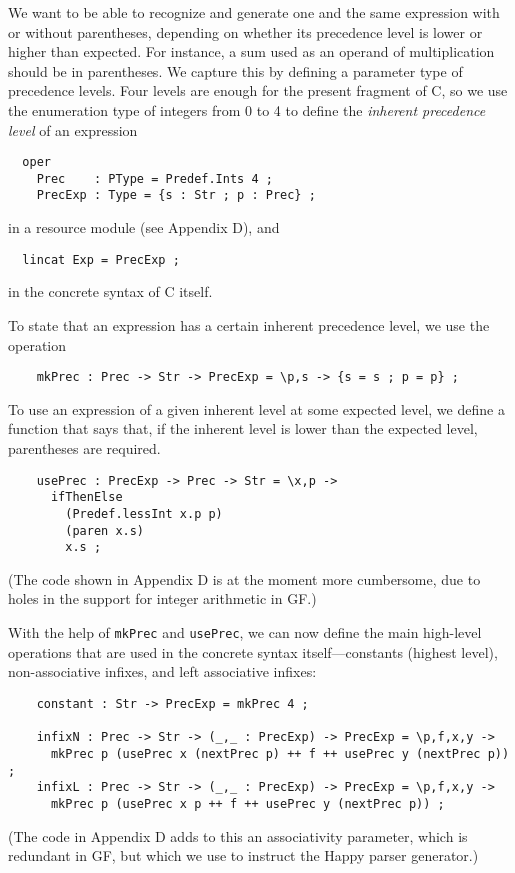 \documentclass[12pt]{article}
\newcommand{\empha}[1]{{\em #1}}
\begin{document}
We want to be able to recognize and generate one and the same expression with
or without parentheses, depending on whether its precedence level
is lower or higher than expected. For instance, a sum used as
an operand of multiplication should be in parentheses. We
capture this by defining a parameter type of
precedence levels. Four levels are enough for the present
fragment of C, so we use the enumeration type of 
integers from 0 to 4 to define the \empha{inherent precedence level}
of an expression
\begin{verbatim} 
  oper 
    Prec    : PType = Predef.Ints 4 ;
    PrecExp : Type = {s : Str ; p : Prec} ;
\end{verbatim}
in a resource module (see Appendix D), and
\begin{verbatim}
  lincat Exp = PrecExp ;
\end{verbatim}
in the concrete syntax of C itself. 

To state that an expression has a certain inherent precedence level,
we use the operation
\begin{verbatim}
    mkPrec : Prec -> Str -> PrecExp = \p,s -> {s = s ; p = p} ;
\end{verbatim}
To use an expression of a given inherent level at some expected level,
we define a function that says that, if the inherent level is lower
than the expected level, parentheses are required. 
\begin{verbatim}
    usePrec : PrecExp -> Prec -> Str = \x,p ->
      ifThenElse 
        (Predef.lessInt x.p p) 
        (paren x.s)
        x.s ;
\end{verbatim}
(The code shown in Appendix D is at the moment more cumbersome,
due to holes in the support for integer arithmetic in GF.)

With the help of \texttt{mkPrec} and \texttt{usePrec},
we can now define the main high-level operations that are
used in the concrete syntax itself---constants (highest level),
non-associative infixes, and left associative infixes:
\begin{verbatim}
    constant : Str -> PrecExp = mkPrec 4 ;

    infixN : Prec -> Str -> (_,_ : PrecExp) -> PrecExp = \p,f,x,y ->
      mkPrec p (usePrec x (nextPrec p) ++ f ++ usePrec y (nextPrec p)) ;
    infixL : Prec -> Str -> (_,_ : PrecExp) -> PrecExp = \p,f,x,y ->
      mkPrec p (usePrec x p ++ f ++ usePrec y (nextPrec p)) ;
\end{verbatim}
(The code in Appendix D adds to this an associativity parameter, 
which is redundant in GF, but which we use to instruct the Happy 
parser generator.)
\end{document}
